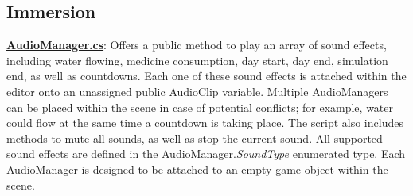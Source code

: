 \documentclass{article}
\begin{document}
\subsection{Immersion} %
\href{https://bit.ly/2HHzDwj}{\textbf{AudioManager.cs}}: Offers a public method to play an array of sound effects, including water flowing, medicine consumption, day start, day end, simulation end, as well as countdowns. Each one of these sound effects is attached within the editor onto an unassigned public AudioClip variable. Multiple AudioManagers can be placed within the scene in case of potential conflicts; for example, water could flow at the same time a countdown is taking place. The script also includes methods to mute all sounds, as well as stop the current sound. All supported sound effects are defined in the AudioManager.\textit{SoundType} enumerated type. Each AudioManager is designed to be attached to an empty game object within the scene.
\end{document}
